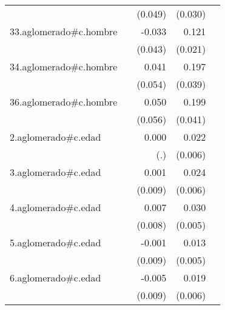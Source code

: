 {\begin{longtable}{l*{4}{D{.}{.}{-1}}}
            &                     &     (0.049)         &     (0.030)         &                     \\
\addlinespace
33.aglomerado#c.hombre&                     &      -0.033         &       0.121\sym{***}&                     \\
            &                     &     (0.043)         &     (0.021)         &                     \\
\addlinespace
34.aglomerado#c.hombre&                     &       0.041         &       0.197\sym{***}&                     \\
            &                     &     (0.054)         &     (0.039)         &                     \\
\addlinespace
36.aglomerado#c.hombre&                     &       0.050         &       0.199\sym{***}&                     \\
            &                     &     (0.056)         &     (0.041)         &                     \\
\addlinespace
2.aglomerado#c.edad&                     &       0.000         &       0.022\sym{***}&                     \\
            &                     &         (.)         &     (0.006)         &                     \\
\addlinespace
3.aglomerado#c.edad&                     &       0.001         &       0.024\sym{***}&                     \\
            &                     &     (0.009)         &     (0.006)         &                     \\
\addlinespace
4.aglomerado#c.edad&                     &       0.007         &       0.030\sym{***}&                     \\
            &                     &     (0.008)         &     (0.005)         &                     \\
\addlinespace
5.aglomerado#c.edad&                     &      -0.001         &       0.013\sym{*}  &                     \\
            &                     &     (0.009)         &     (0.005)         &                     \\
\addlinespace
6.aglomerado#c.edad&                     &      -0.005         &       0.019\sym{**} &                     \\
            &                     &     (0.009)         &     (0.006)         &                     \\

\end{longtable}}
